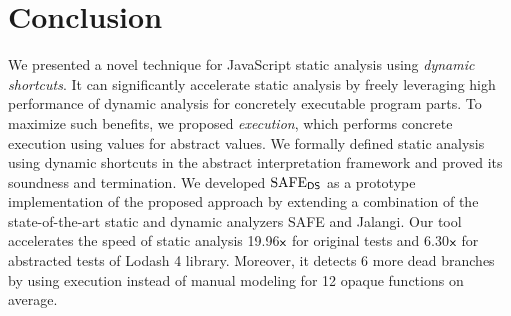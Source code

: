 \section{Conclusion}\label{sec:conclusion}
We presented a novel technique for JavaScript static analysis using \textit{dynamic shortcuts}.
It can significantly accelerate static
analysis by freely leveraging high performance of dynamic analysis for
concretely executable program parts.  To maximize such benefits,
we proposed \textit{{\sealed} execution}, which performs
concrete execution using {\sealed} values for abstract values.
We formally defined static analysis using dynamic shortcuts in the
abstract interpretation framework and proved its soundness and termination.
We developed $\text{SAFE}_{\textsf{DS}}$ as a prototype implementation of the proposed approach
by extending a combination of the state-of-the-art static and dynamic
analyzers SAFE and Jalangi.  Our tool accelerates the speed
of static analysis 19.96${\textsf{x}}$ for original tests and 6.30${\textsf{x}}$ for
abstracted tests of Lodash 4 library.  Moreover, it detects 6 more
dead branches by using {\sealed} execution instead of
manual modeling for 12 opaque functions on average.
